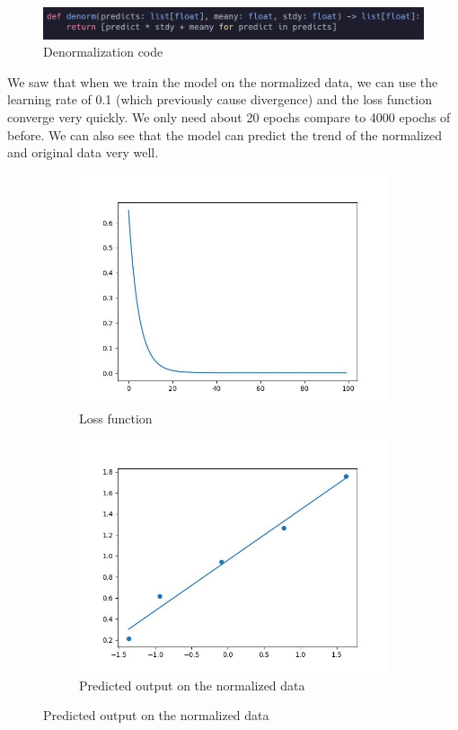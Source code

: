 \documentclass{article}
\begin{document}
\begin{figure}[H]
    \centering
    \includegraphics[width=0.75\linewidth]{denorm.png}
    \caption{Denormalization code}
    \label{fig:enter-label}
\end{figure}

We saw that when we train the model on the normalized data, we can use the learning rate of 0.1 (which previously cause divergence) and the loss function converge very quickly. We only need about 20 epochs compare to 4000 epochs of before. We can also see that the model can predict the trend of the normalized and original data very well.

\begin{figure}[H]
\centering
    \begin{subfigure}{0.5\linewidth}
    
        \includegraphics[width=\linewidth]{loss.jpg} 
        \caption{Loss function}
    \end{subfigure}
        
    \begin{subfigure}{0.5\linewidth}
        \includegraphics[width=\linewidth]{output_norm.jpg} 
        \caption{Predicted output on the normalized data}
    \end{subfigure}
    

\end{figure}
\end{document}
